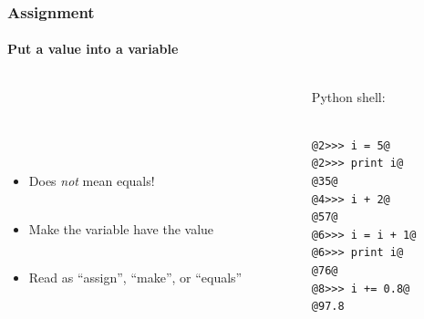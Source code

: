 \documentclass{beamer}
\begin{document}
\begin{frame}[fragile]
\frametitle{Assignment}
\framesubtitle{Put a value into a variable}
\large
  \begin{columns}[T]
    \begin{column}{.5\textwidth} 
\ \\ 

\ \\ 
\ \\ 

\ \\ 

\begin{itemize}



 \item Does \emph{not} mean equals!\\ \
 \item  Make the variable have the value \\ \

 \item Read as ``assign'', ``make'', or ``equals'' \\ \


\end{itemize}
     \end{column}
     
         \begin{column}{.5\textwidth} 
         Python shell: \\ \
\begin{lstlisting}[style=base]
@2>>> i = 5@
@2>>> print i@
@35@
@4>>> i + 2@
@57@
@6>>> i = i + 1@
@6>>> print i@
@76@
@8>>> i += 0.8@
@97.8
\end{lstlisting}

    \end{column}
    \end{columns}

\end{frame}
\end{document}
